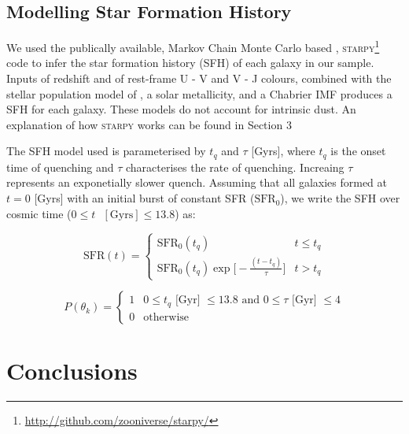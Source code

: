 \documentclass[a4paper,fleqn,usenatbib]{mnras}
\begin{document}
   \subsection{Modelling Star Formation History}

   We used the publically available, Markov Chain Monte Carlo based \citep{mackey2013},
   \textsc{starpy}\footnote{\url{http://github.com/zooniverse/starpy/}} code to infer the star formation 
   history (SFH) of each galaxy in our sample. Inputs of redshift and of rest-frame U - V and V - J colours, 
   combined with the stellar population model of \cite{bruzual2003}, a solar metallicity, and a Chabrier IMF 
   \cite{chabrier2003} produces a SFH for each galaxy. These models do not account for intrinsic dust. An 
   explanation of how \textsc{starpy} works can be found in Section 3

   The SFH model used is parameterised by $t_{q}$ and $\tau$ [Gyrs], where $t_{q}$ is the onset time of quenching
   and $\tau$ characterises the rate of quenching. Increaing $\tau$ represents an exponetially slower quench. 
   Assuming that all galaxies formed at $t=0$ [Gyrs] with an initial burst of constant SFR ($\text{SFR}_{0}$), 
   we write the SFH over cosmic time ($0\leq t \text{ }[\text{Gyrs}]\leq 13.8$) as:

 \begin{equation}
       \text{SFR}(t) = \begin{cases}
                 \text{SFR}_{0}(t_{q}) & t \leq t_{q} \\
                 \text{SFR}_{0}(t_{q})\exp\bigg[-\frac{(t-t_{q})}{\tau}\bigg] & t > t_{q} 
                \end{cases}
        \label{eq:model}
 \end{equation}

   

   \begin{equation}
      P(\theta_{k}) = \begin{cases}
                       1 & 0\leq t_{q}\text{ [Gyr] } \leq 13.8 \text{ and }  0 \leq \tau\text{ [Gyr] } \leq 4 \\
                       0 & \text{otherwise}
                      \end{cases}
      \label{eq:prior}
   \end{equation}

\section{Conclusions}
\end{document}
